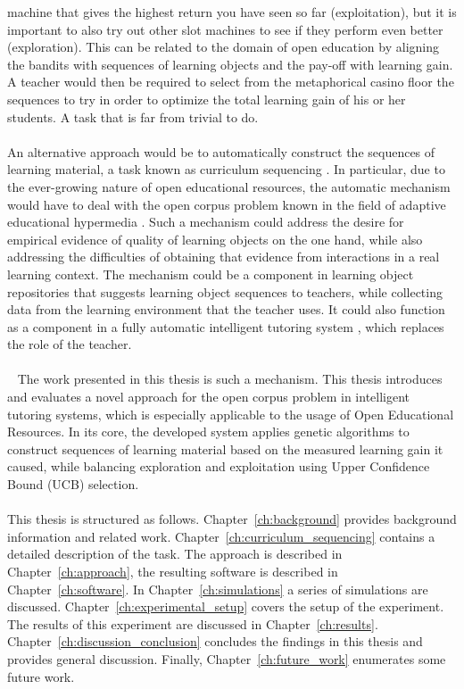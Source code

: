machine that gives the highest return you have seen so far (exploitation), but
it is important to also try out other slot machines to see if they perform even
better (exploration). This can be related to the domain of open education by
aligning the bandits with sequences of learning objects and the pay-off
with learning gain. A teacher would then be required to select from the
metaphorical casino floor the sequences to try in order to optimize the total
learning gain of his or her students. A task that is far from trivial to do.
\\\\
\noindent
An alternative approach would be to automatically construct the sequences of
learning material, a task known as curriculum sequencing \citep{AlMuhaideb2011}.
In particular, due to the ever-growing nature of open educational resources,
the automatic mechanism would have to deal with the open corpus problem known
in the field of adaptive educational hypermedia \citep{Brusilovsky2007}.
Such a mechanism could address the desire for empirical evidence
of quality of learning objects on the one hand, while also addressing the
difficulties of obtaining that evidence from interactions in a real learning
context. The mechanism could be a component in learning object repositories
that suggests learning object sequences to teachers, while collecting data from
the learning environment that the teacher uses. It could also
function as a component in a fully automatic intelligent tutoring system
\citep{Psotka1988}, which replaces the role of the teacher.\\\\\
\noindent
The work presented in this thesis is such a mechanism.
This thesis introduces and evaluates a novel approach for
the open corpus problem in intelligent tutoring systems, which is especially
applicable to the usage of Open Educational Resources.
In its core, the developed system applies genetic algorithms to construct
sequences of learning material based on the measured learning gain it caused,
while balancing exploration and exploitation using Upper Confidence Bound (UCB)
selection.\\\\
\noindent
This thesis is structured as follows. Chapter~\ref{ch:background} provides
background information and related work. Chapter~\ref{ch:curriculum_sequencing}
contains a detailed description of the task. The approach is described in
Chapter~\ref{ch:approach}, the resulting software is described in
Chapter~\ref{ch:software}. In Chapter~\ref{ch:simulations} a series of
simulations are discussed. Chapter~\ref{ch:experimental_setup} covers the setup
of the experiment. The results of this experiment are discussed in
Chapter~\ref{ch:results}. Chapter~\ref{ch:discussion_conclusion} concludes the
findings in this thesis and provides general discussion. Finally,
Chapter~\ref{ch:future_work} enumerates some future work.
